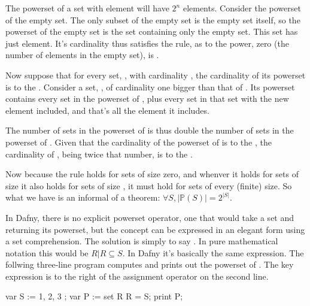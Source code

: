 \documentclass[letterpaper,10pt,english]{sphinxmanual}
\begin{document}
The powerset of a set with  element will have \(2^n\) elements.
Consider the powerset of the empty set. The only subset of the empty
set is the empty set itself, so the powerset of the empty set is the
set containing only the empty set. This set has just  element. It’s
cardinality thus satisfies the rule, as  to the power, zero (the
number of elements in the empty set), is .

Now suppose that for every set, , with cardinality , the
cardinality of its powerset is  to the . Consider a set, ,
of cardinality one bigger than that of . Its powerset contains
every set in the powerset of , plus every set in that set with the
new element included, and that’s all the element it includes.

The number of sets in the powerset of  is thus double the number
of sets in the powerset of . Given that the cardinality of the
powerset of  is  to the , the cardinality of , being
twice that number, is  to the .

Now because the rule holds for sets of size zero, and whenver it holds
for sets of size  it also holds for sets of size , it must
hold for sets of every (finite) size. So what we have is an informal
 of a theorem: \(\forall S, |{\mathbb P}(S)|
= 2^{|S|}\).

In Dafny, there is no explicit powerset operator, one that would take
a set and returning its powerset, but the concept can be expressed in
an elegant form using a set comprehension. The solution is simply to
say . In pure
mathematical notation this would be \({ R | R \subseteq S }.\) In
Dafny it’s basically the same expression.  The follwing three-line
program computes and prints out the powerset of .
The key expression is to the right of the assignment operator on the
second line.

\begin{sphinxVerbatim}[commandchars=\\\{\}]
var S := \PYGZob{} 1, 2, 3 \PYGZcb{};
var P := set R \textbar{} R \PYGZlt{}= S;
print P;
\end{sphinxVerbatim}
\end{document}
